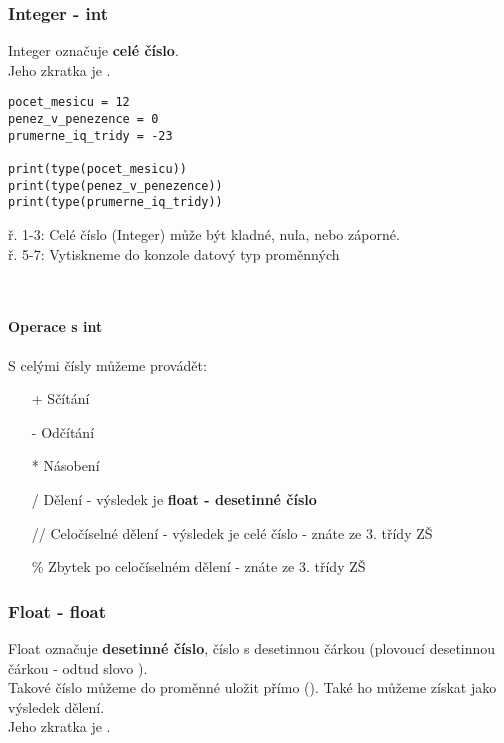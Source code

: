 \subsubsection{Integer - int}
Integer označuje \textbf{celé číslo}.\\Jeho zkratka je .\\
\begin{minipage}[t]{.45\textwidth}
\begin{code}
\begin{verbatim}
pocet_mesicu = 12
penez_v_penezence = 0
prumerne_iq_tridy = -23

print(type(pocet_mesicu))
print(type(penez_v_penezence))
print(type(prumerne_iq_tridy))
\end{verbatim}

\label{code:typy_int}
\end{code}
\end{minipage}
\begin{minipage}[t]{.45\textwidth}
ř. 1-3:	Celé číslo (Integer) může být kladné, nula, nebo záporné.\\
ř. 5-7:	Vytiskneme do konzole datový typ proměnných
\end{minipage}\\ 

\paragraph{Operace s int}
S celými čísly můžeme provádět:
\begin{enumerate}
\item[+] Sčítání
\item[-] Odčítání
\item[*] Násobení
\item[/] Dělení - výsledek je \textbf{float - desetinné číslo}
\item[//]Celočíselné dělení - výsledek je celé číslo - znáte ze 3. třídy ZŠ
\item[\%]Zbytek po celočíselném dělení - znáte ze 3. třídy ZŠ
\end{enumerate}

\subsubsection{Float - float}
Float označuje \textbf{desetinné číslo}, číslo s desetinnou čárkou (plovoucí desetinnou čárkou - odtud slovo ).\\
Takové číslo můžeme do proměnné uložit přímo (). Také ho můžeme získat jako výsledek dělení.\\
Jeho zkratka je .\\

